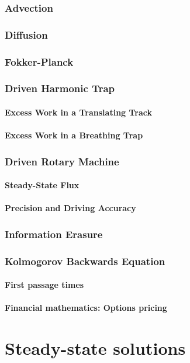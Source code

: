 \documentclass[15pt]{article}
\begin{document}
    \section{Advection}

    \section{Diffusion}

    \section{Fokker-Planck}


    \section{Driven Harmonic Trap}

    \subsection{Excess Work in a Translating Track}

    \subsection{Excess Work in a Breathing Trap}


    \section{Driven Rotary Machine}

    \subsection{Steady-State Flux}

    \subsection{Precision and Driving Accuracy}

    \section{Information Erasure}

    \section{Kolmogorov Backwards Equation}

    \subsection{First passage times}

    \subsection{Financial mathematics: Options pricing}


\part{Steady-state solutions}

\end{document}
